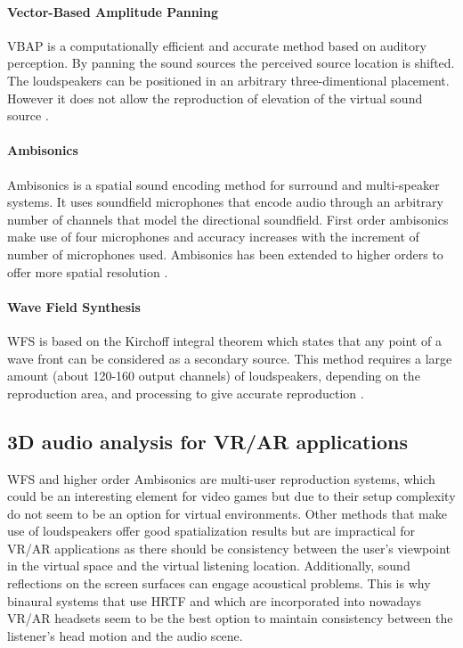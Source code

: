 \paragraph{Vector-Based Amplitude Panning\\}\label{par:vbap}

\gls{VBAP} is a computationally efficient and accurate method based on auditory perception. By panning the sound sources the perceived source location is shifted. The loudspeakers can be positioned in an arbitrary three-dimentional placement. However it does not allow the reproduction of elevation of the virtual sound source \cite{pulkki1997virtual}.

\paragraph{Ambisonics\\}\label{par:ambisonics}

Ambisonics is a spatial sound encoding method for surround and multi-speaker systems. It uses soundfield microphones that encode audio through an arbitrary number of channels that model the directional soundfield. First order ambisonics make use of four microphones and accuracy increases with the increment of number of microphones used.  Ambisonics has been extended to higher orders to offer more spatial resolution \cite{daniel2003further}. 

\paragraph{Wave Field Synthesis\\}\label{par:wfs}

\gls{WFS} is based on the Kirchoff integral theorem which states that any point of a wave front can be considered as a secondary source. This method requires a large amount (about 120-160 output channels) of loudspeakers, depending on the reproduction area, and processing to give accurate reproduction \cite{funkhouser2002sounds}.

\subsection{3D audio analysis for VR/AR applications}

\gls{WFS} and higher order Ambisonics are multi-user reproduction systems, which could be an interesting element for video games but due to their setup complexity do not seem to be an option for virtual environments. Other methods that make use of loudspeakers offer good spatialization results but are impractical for \gls{VR}/\gls{AR} applications as there should be consistency between the user's viewpoint in the virtual space and the virtual listening location. Additionally, sound reflections on the screen surfaces can engage acoustical problems. This is why binaural systems that use \gls{HRTF} and which are incorporated into nowadays \gls{VR}/\gls{AR} headsets seem to be the best option to maintain consistency between the listener's head motion and the audio scene.